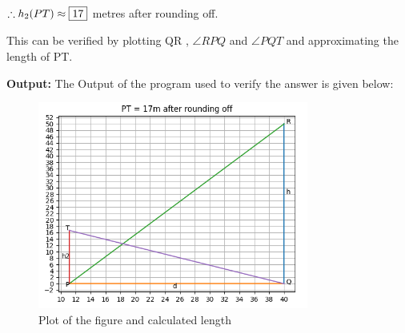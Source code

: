 \documentclass[journal,12pt,twocolumn]{IEEEtran}
\begin{document}
\begin{flushleft}
$\therefore h_2(PT)   \approx \fbox{17} $ metres after rounding off.


This can be verified by plotting QR , $\angle RPQ$ and $\angle PQT$ and approximating 
the length of PT.

\noindent\textbf{Output:}
The Output of the program used to verify the answer is given below:

\begin{figure}[h]
\includegraphics[width=252pt]{output.png}
\caption{Plot of the figure and calculated length}

\end{figure}
\end{flushleft}
\end{document}
